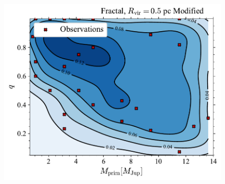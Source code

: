 \documentclass[aa]{lib/aa}
\begin{document}
\begin{figure}
    \centering
        \includegraphics[width=.91\columnwidth]{figures/mass_distr_Fractal_rvir0.5_mod_params.pdf}
        \caption{}
         \label{Fig:Fr_mass_ratio_distribution}
\end{figure}
\end{document}
